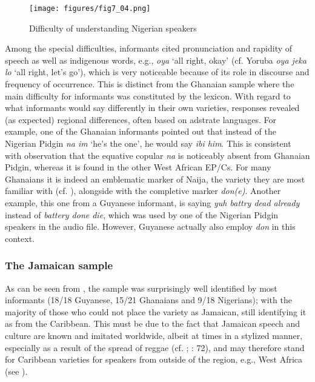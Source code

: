 \documentclass[output=paper,colorlinks,citecolor=brown]{langscibook}
\begin{document}
\begin{figure}
    \texttt{[image: figures/fig7\_04.png]}
    \caption{Difficulty of understanding Nigerian speakers}
    \label{fig:fig7_04}
\end{figure}

Among the special difficulties, informants cited pronunciation and rapidity of speech as well as indigenous words, e.g., \emph{oya} ‘all right, okay’ (cf. Yoruba \emph{oya jeka lo} ‘all right, let’s go’), which is very noticeable because of its role in discourse and frequency of occurrence. This is distinct from the Ghanaian sample where the main difficulty for informants was constituted by the lexicon. With regard to what informants would say differently in their own varieties, responses revealed (as expected) regional differences, often based on adstrate languages. For example, one of the Ghanaian informants pointed out that instead of the Nigerian Pidgin \emph{na im} ‘he’s the one’, he would say \emph{ibi him}. This is consistent with  observation that the equative copular \emph{na} is noticeably absent from Ghanaian Pidgin, whereas it is found in the other West African EP/Cs. For many Ghanaians it is indeed an emblematic marker of Naija, the variety they are most familiar with (cf. ), alongside with the completive marker \emph{don(e)}. Another example, this one from a Guyanese informant, is saying \emph{yuh battry dead already} instead of \emph{battery done die}, which was used by one of the Nigerian Pidgin speakers in the audio file. However, Guyanese actually also employ \emph{don} in this context.

\subsubsection{The Jamaican sample}\label{sec:04:3.1.3}

As can be seen from , the sample was surprisingly well identified by most informants (18/18 Guyanese, 15/21 Ghanaians and 9/18 Nigerians); with the majority of those who could not place the variety as Jamaican, still identifying it as from the Caribbean. This must be due to the fact that Jamaican speech and culture are known and imitated worldwide, albeit at times in a stylized manner, especially as a result of the spread of reggae (cf. \cite{Tomei_Hollington_2018}; \cite{Moll_2017}: 72), and may therefore stand for Caribbean varieties for speakers from outside of the region, e.g., West Africa (see ).
\end{document}
